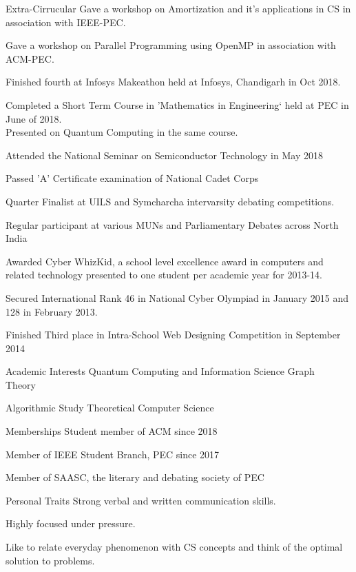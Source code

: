 \documentclass{resume} %
\begin{document}
\begin{rSection}{Extra-Cirrucular} \itemsep -3pt
Gave a workshop on Amortization and it's applications in CS in association with IEEE-PEC.
\item Gave a workshop on Parallel Programming using OpenMP in association with ACM-PEC.
\item Finished fourth at Infosys Makeathon held at Infosys, Chandigarh in Oct 2018.  
\item Completed a Short Term Course in 'Mathematics in Engineering` held at PEC in June of 2018. \\ Presented on Quantum Computing in the same course.
\item Attended the National Seminar on Semiconductor Technology in May 2018
\item Passed 'A' Certificate examination of National Cadet Corps 
\item Quarter Finalist at UILS and Symcharcha intervarsity debating competitions.
\item Regular participant at various MUNs and Parliamentary Debates across North India
\item Awarded Cyber WhizKid, a school level excellence award in computers and related technology presented to one student per academic year for 2013-14.
\item Secured International Rank 46 in National Cyber Olympiad in January 2015 and 128 in February 2013.
\item Finished Third place in Intra-School Web Designing Competition in September 2014  

\end{rSection}
\begin{rSection}{Academic Interests}
 Quantum Computing and Information Science \hfill  Graph Theory\ \item Algorithmic Study \hfill Theoretical Computer Science
\end{rSection}

\begin{rSection}{Memberships}
 Student member of ACM since 2018
\item Member of IEEE Student Branch, PEC since 2017
\item Member of SAASC, the literary and debating society of PEC
\end{rSection}

\begin{rSection}{Personal Traits}
Strong verbal and written communication skills.
\item Highly focused under pressure. 
\item Like to relate everyday phenomenon with CS concepts and think of the optimal solution to problems. 
\end{rSection}
\end{document}
